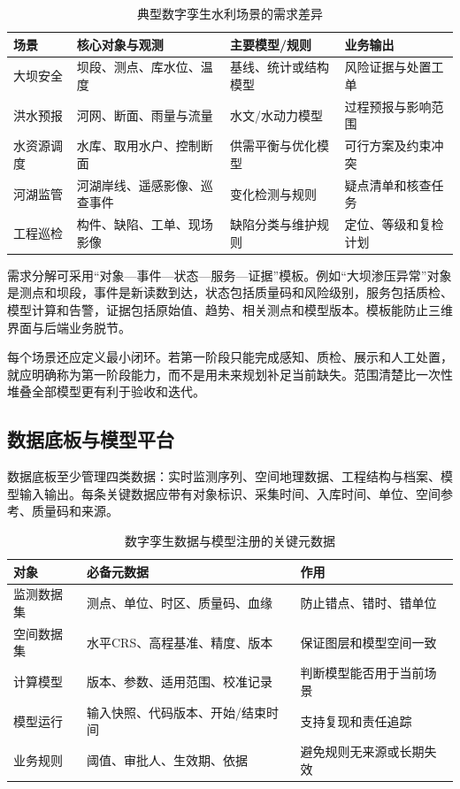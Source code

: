 \begin{table}[htbp]
\centering
\caption{典型数字孪生水利场景的需求差异}
\label{tab:dt-scenario-requirements}
\begin{tabular}{p{2.6cm}p{3.4cm}p{3.5cm}p{3.5cm}}
\toprule
场景 & 核心对象与观测 & 主要模型/规则 & 业务输出 \\
\midrule
大坝安全 & 坝段、测点、库水位、温度 & 基线、统计或结构模型 & 风险证据与处置工单 \\
洪水预报 & 河网、断面、雨量与流量 & 水文/水动力模型 & 过程预报与影响范围 \\
水资源调度 & 水库、取用水户、控制断面 & 供需平衡与优化模型 & 可行方案及约束冲突 \\
河湖监管 & 河湖岸线、遥感影像、巡查事件 & 变化检测与规则 & 疑点清单和核查任务 \\
工程巡检 & 构件、缺陷、工单、现场影像 & 缺陷分类与维护规则 & 定位、等级和复检计划 \\
\bottomrule
\end{tabular}
\end{table}

需求分解可采用“对象—事件—状态—服务—证据”模板。例如“大坝渗压异常”对象是测点和坝段，事件是新读数到达，状态包括质量码和风险级别，服务包括质检、模型计算和告警，证据包括原始值、趋势、相关测点和模型版本。模板能防止三维界面与后端业务脱节。

每个场景还应定义最小闭环。若第一阶段只能完成感知、质检、展示和人工处置，就应明确称为第一阶段能力，而不是用未来规划补足当前缺失。范围清楚比一次性堆叠全部模型更有利于验收和迭代。

\subsection{数据底板与模型平台}

数据底板至少管理四类数据：实时监测序列、空间地理数据、工程结构与档案、模型输入输出。每条关键数据应带有对象标识、采集时间、入库时间、单位、空间参考、质量码和来源。

\begin{table}[htbp]
\centering
\caption{数字孪生数据与模型注册的关键元数据}
\label{tab:dt-metadata}
\begin{tabular}{p{3cm}p{4.2cm}p{5.6cm}}
\toprule
对象 & 必备元数据 & 作用 \\
\midrule
监测数据集 & 测点、单位、时区、质量码、血缘 & 防止错点、错时、错单位 \\
空间数据集 & 水平CRS、高程基准、精度、版本 & 保证图层和模型空间一致 \\
计算模型 & 版本、参数、适用范围、校准记录 & 判断模型能否用于当前场景 \\
模型运行 & 输入快照、代码版本、开始/结束时间 & 支持复现和责任追踪 \\
业务规则 & 阈值、审批人、生效期、依据 & 避免规则无来源或长期失效 \\
\bottomrule
\end{tabular}
\end{table}

